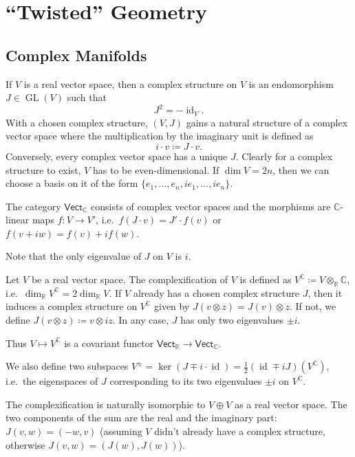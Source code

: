 \documentclass[english,letterpaper]{article}%
\numberwithin{equation}{section}
\numberwithin{figure}{section}
\numberwithin{table}{section}
\theoremstyle{definition}
\theoremstyle{definition}
\theoremstyle{definition}
\theoremstyle{plain}
\theoremstyle{plain}
\theoremstyle{plain}
\theoremstyle{plain}
\theoremstyle{remark}
\theoremstyle{remark}
\DeclareMathOperator{\id}{id}
\DeclareMathOperator{\GL}{GL}
\begin{document}
\section{``Twisted'' Geometry}

\subsection{Complex Manifolds}

\begin{defn}
    If $V$ is a real vector space, then a complex structure on $V$ is an endomorphism $J\in \GL(V)$ such that 
    \[J^2=-\id_V.\]
    With a chosen complex structure, $(V,J)$ gains a natural structure of a complex vector space where the multiplication by the imaginary unit is defined as
    \[i\cdot v\coloneqq J\cdot v.\]
    Conversely, every complex vector space has a unique $J$. Clearly for a complex structure to exist, $V$ has to be even-dimensional. If $\dim V=2n$, then we can choose a basis on it of the form $\{e_1,\ldots,e_n,ie_1,\ldots,ie_n\}$.
    
    The category $\mathsf{Vect}_{\mathbb{C}}$ consists of complex vector spaces and the morphisms are $\mathbb{C}$-linear maps $f:V\to V'$, i.e.\ $f(J\cdot v)=J'\cdot f(v)$ or $f(v+iw)=f(v)+if(w)$.
\end{defn}

Note that the only eigenvalue of $J$ on $V$ is $i$.

\begin{defn}
    Let $V$ be a real vector space. The complexification of $V$ is defined as $V^\mathbb{C}\coloneqq V\otimes_\mathbb{R} \mathbb{C}$, i.e.\ $\dim_\mathbb{R}V^\mathbb{C}=2\dim_\mathbb{R}V$. If $V$ already has a chosen complex structure $J$, then it induces a complex structure on $V^\mathbb{C}$ given by $J(v\otimes z)=J(v)\otimes z$. If not, we define $J(v\otimes z)\coloneqq v\otimes iz$. In any case, $J$ has only two eigenvalues $\pm i$.
    
    Thus $V\mapsto V^{\mathbb{C}}$ is a covariant functor $\mathsf{Vect}_\mathbb{R}\to \mathsf{Vect}_\mathbb{C}$.
    
    We also define two subspaces $V^\pm=\ker(J\mp i\cdot\id)=\frac12(\id\mp iJ)(V^\mathbb{C})$, i.e.\ the eigenspaces of $J$ corresponding to its two eigenvalues $\pm i$ on $V^\mathbb{C}$.
\end{defn}

The complexification is naturally isomorphic to $V\oplus V$ as a real vector space. The two components of the sum are the real and the imaginary part: $J(v,w)=(-w,v)$ (assuming $V$ didn't already have a complex structure, otherwise $J(v,w)=(J(w),J(w))$).
\end{document}
